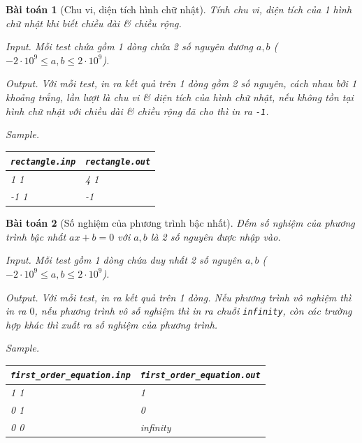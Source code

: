 \documentclass[12pt]{article}
\newtheorem{baitoan}{Bài toán}
\begin{document}
\begin{baitoan}[Chu vi, diện tích hình chữ nhật]
    Tính chu vi, diện tích của 1 hình chữ nhật khi biết chiều dài \& chiều rộng.
    \item {\sf Input.} Mỗi test chứa gồm 1 dòng chứa 2 số nguyên dương $a,b$ ($-2\cdot10^9\le a,b\le2\cdot10^9$).
    \item {\sf Output.} Với mỗi test, in ra kết quả trên 1 dòng gồm 2 số nguyên, cách nhau bởi 1 khoảng trắng, lần lượt là chu vi \& diện tích của hình chữ nhật, nếu không tồn tại hình chữ nhật với chiều dài \& chiều rộng đã cho thì in ra {\tt-1}.
    \item {\sf Sample.}
    \begin{table}[H]
        \centering
        \begin{tabular}{|l|l|}
            \hline
            \verb|rectangle.inp| & \verb|rectangle.out| \\
            \hline
            1 1 & 4 1 \\
            \hline
            -1 1 &  -1\\
            \hline
        \end{tabular}
    \end{table}
\end{baitoan}

\begin{baitoan}[Số nghiệm của phương trình bậc nhất]
    Đếm số nghiệm của phương trình bậc nhất $ax + b = 0$ với $a, b$ là 2 số nguyên được nhập vào.
    \item {\sf Input.} Mỗi test gồm 1 dòng chứa duy nhất 2 số nguyên $a,b$ ($-2\cdot10^9\le a,b\le2\cdot10^9$).
    \item {\sf Output.} Với mỗi test, in ra kết quả trên 1 dòng. Nếu phương trình vô nghiệm thì in ra $0$, nếu phương trình vô số nghiệm thì in ra chuỗi {\tt infinity}, còn các trường hợp khác thì xuất ra số nghiệm của phương trình.
    \item {\sf Sample.}
    \begin{table}[H]
        \centering
        \begin{tabular}{|l|l|}
            \hline
            \verb|first_order_equation.inp| & \verb|first_order_equation.out| \\
            \hline
            1 1 & 1 \\
            \hline
            0 1 & 0 \\
            \hline
            0 0  & infinity \\
            \hline
        \end{tabular}
    \end{table}
\end{baitoan}
\end{document}
